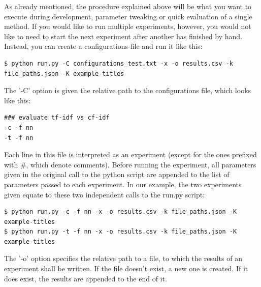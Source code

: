 \documentclass{article}
\begin{document}
As already mentioned, the procedure explained above will be what you want to execute during development,
parameter tweaking or quick evaluation of a single method. If you would like to run multiple experiments, however,
you would not like to need to start the next experiment after another has finished by hand. Instead, you can create a
configurations-file and run it like this:
\begin{lstlisting}[basicstyle=\ttfamily]
$ python run.py -C configurations_test.txt -x -o results.csv -k file_paths.json -K example-titles
\end{lstlisting}
The '-C' option is given the relative path to the configurations file, which looks like this:
 \begin{lstlisting}[language={}]
### evaluate tf-idf vs cf-idf
-c -f nn
-t -f nn
\end{lstlisting}
Each line in this file is interpreted as an experiment (except for the ones prefixed with \#, which denote comments).
Before running the experiment, all parameters given in the original call to the python script are appended to the list
of parameters passed to each experiment. In our example, the two experiments given equate to these two independent calls to
the run.py script:
\begin{lstlisting}[basicstyle=\ttfamily]
$ python run.py -c -f nn -x -o results.csv -k file_paths.json -K example-titles
$ python run.py -t -f nn -x -o results.csv -k file_paths.json -K example-titles
\end{lstlisting}
The '-o' option specifies the relative path to a file, to which the results of an experiment shall be written.
If the file doesn't exist, a new one is created. If it does exist, the results are appended to the end of it.
\end{document}
